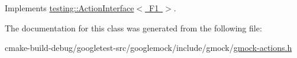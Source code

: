 Implements \mbox{\hyperlink{classtesting_1_1ActionInterface_a20f8624fcea1786f2992b358760422a0}{testing\+::\+Action\+Interface$<$ F1 $>$}}.



The documentation for this class was generated from the following file\+:\begin{DoxyCompactItemize}
\item 
cmake-\/build-\/debug/googletest-\/src/googlemock/include/gmock/\mbox{\hyperlink{gmock-actions_8h}{gmock-\/actions.\+h}}\end{DoxyCompactItemize}

